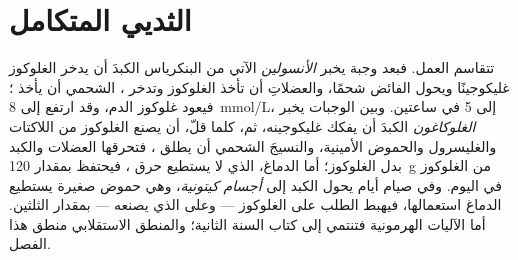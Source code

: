 \section{الثديي المتكامل}

\begin{proposition}\label{prop:b1:biosyntheses-integration:fedfasting}
تتقاسم  العمل. فبعد وجبة يخبر \emph{الأنسولين} الآتي من
البنكرياس الكبدَ أن يدخر الغلوكوز غليكوجينًا ويحول الفائض شحمًا،
والعضلاتِ أن تأخذ الغلوكوز وتدخر ،  الشحمي أن يأخذ
؛ فيعود غلوكوز الدم، وقد ارتفع إلى \qty{8}{mmol/L}، إلى
\qty{5}{} في ساعتين. وبين الوجبات يخبر \emph{الغلوكاغون} الكبدَ أن
يفكك غليكوجينه، ثم، كلما قلّ، أن يصنع الغلوكوز من اللاكتات والغليسرول
والحموض الأمينية، والنسيجَ الشحمي أن يطلق ، فتحرقها
العضلات والكبد بدل الغلوكوز؛ أما الدماغ، الذي لا يستطيع حرق ،
فيحتفظ بمقدار \qty{120}{g} من الغلوكوز في اليوم. وفي صيام أيام يحول الكبد
 إلى \emph{أجسام كيتونية}، وهي حموض صغيرة يستطيع الدماغ
استعمالها، فيهبط الطلب على الغلوكوز --- وعلى  الذي يصنعه ---
بمقدار الثلثين. أما الآليات الهرمونية فتنتمي إلى كتاب السنة الثانية؛
والمنطق الاستقلابي منطق هذا الفصل.
\end{proposition}

